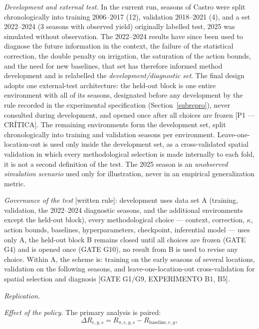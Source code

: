\documentclass[times,final,authoryear]{elsarticle}
\begin{document}
\emph{Development and external test.} In the current run, seasons of Castro were split chronologically into training 2006--2017 (12), validation 2018--2021 (4), and a set 2022--2024 (3 seasons with observed yield) originally labelled test, 2025 was simulated without observation. The 2022--2024 results have since been used to diagnose the future information in the context, the failure of the statistical correction, the double penalty on irrigation, the saturation of the action bounds, and the need for new baselines, that set has therefore informed method development and is relabelled the \emph{development/diagnostic set}. The final design adopts one external-test architecture: the held-out block is one entire environment with all of its seasons, designated before any development by the rule recorded in the experimental specification (Section~\ref{subrepro}), never consulted during development, and opened once after all choices are frozen [P1 --- CRÍTICA]. The remaining environments form the development set, split chronologically into training and validation seasons per environment. Leave-one-location-out is used only inside the development set, as a cross-validated spatial validation in which every methodological selection is made internally to each fold, it is not a second definition of the test.  The 2025 season is an \emph{unobserved simulation scenario} used only for illustration, never in an empirical generalization metric.

\emph{Governance of the test} [written rule]: development uses data set A (training, validation, the 2022--2024 diagnostic seasons, and the additional environments except the held-out block), every methodological choice --- context, correction, $\kappa$, action bounds, baselines, hyperparameters, checkpoint, inferential model --- uses only A, the held-out block B remains closed until all choices are frozen (GATE G4) and is opened once (GATE G10), no result from B is used to revise any choice. Within A, the scheme is: training on the early seasons of several locations, validation on the following seasons, and leave-one-location-out cross-validation for spatial selection and diagnosis [GATE G1/G9, EXPERIMENTO B1, B5].

\emph{Replication.} 

\emph{Effect of the policy.} The primary analysis is paired:
\begin{equation}

\Delta R_{e,y,s} = R_{\pi,e,y,s} - R_{\text{baseline},e,y},

\label{eq_paired}
\end{equation}
\end{document}
